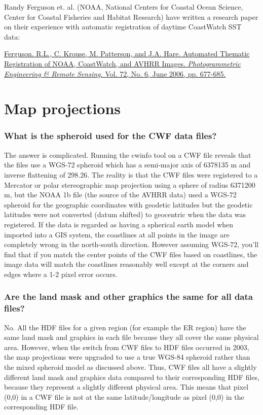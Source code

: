 Randy Ferguson et. al. (NOAA, National Centers for Coastal Ocean
Science, Center for Coastal Fisheries and Habitat Research) have
written a research paper on their experience with automatic
registration of daytime CoastWatch SST data:

\href{http://www.asprs.org/publications/pers/2006journal/june/abstracts.html}{Ferguson. R.L.,
C. Krouse, M. Patterson, and J.A. Hare.  Automated Thematic
Registration of NOAA, CoastWatch, and AVHRR Images.  {\it
Photogrammetric Engineering \& Remote Sensing.} Vol. 72, No. 6,
June 2006, pp. 677-685.}

\section{Map projections}

\subsubsection*{What is the spheroid used for the CWF data files?}

The answer is complicated.  Running the cwinfo tool on a CWF file
reveals that the files use a WGS-72 spheroid which has a semi-major
axis of 6378135 m and inverse flattening of 298.26.  The reality is
that the CWF files were registered to a Mercator or polar
stereographic map projection using a sphere of radius 6371200 m, but
the NOAA 1b file (the source of the AVHRR data) used a WGS-72 spheroid
for the geographic coordinates with geodetic latitudes but the
geodetic latitudes were not converted (datum shifted) to geocentric
when the data was registered.  If the data is regarded as having a
spherical earth model when imported into a GIS system, the coastlines
at all points in the image are completely wrong in the north-south
direction.  However assuming WGS-72, you'll find that if you match the
center points of the CWF files based on coastlines, the image data
will match the coastlines reasonably well except at the corners and
edges where a 1-2 pixel error occurs.

\subsubsection*{Are the land mask and other graphics the same for all data files?}

No.  All the HDF files for a given region (for example the ER region)
have the same land mask and graphics in each file because they all
cover the same physical area.  However, when the switch from CWF files
to HDF files occurred in 2003, the map projections were upgraded to
use a true WGS-84 spheroid rather than the mixed spheroid model as
discussed above.  Thus, CWF files all have a slightly different land
mask and graphics data compared to their corresponding HDF files,
because they represent a slightly different physical area.  This means
that pixel (0,0) in a CWF file is not at the same latitude/longitude
as pixel (0,0) in the corresponding HDF file.

